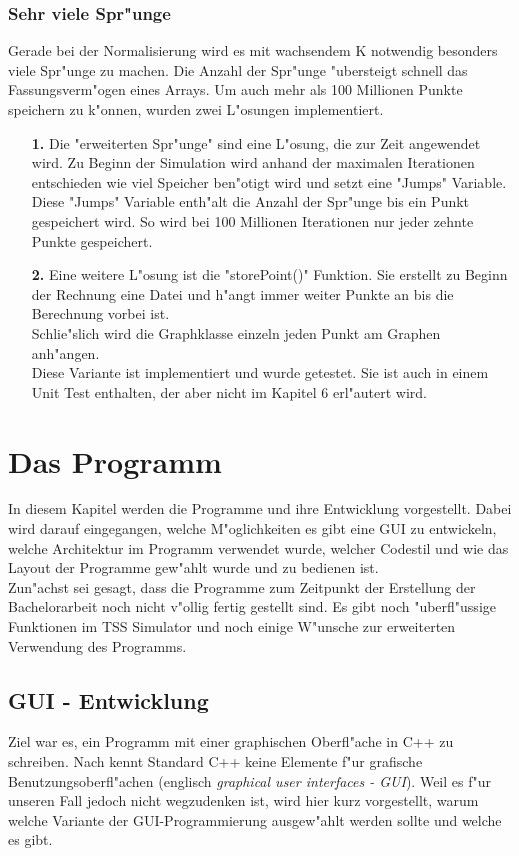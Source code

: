\documentclass[11pt, a4paper, german]{article}
\theoremstyle{plain}
\begin{document}
	\subsubsection{Sehr viele Spr"unge}
	Gerade bei der Normalisierung wird es mit wachsendem K notwendig besonders viele Spr"unge zu machen. Die Anzahl der Spr"unge "ubersteigt schnell das Fassungsverm"ogen eines Arrays.	Um auch mehr als 100 Millionen Punkte speichern zu k"onnen, wurden zwei L"osungen implementiert.\\
	\begin{itemize}
		\item[\textbf{1.}] Die "{}erweiterten Spr"unge"{} sind eine L"osung, die zur Zeit angewendet wird. Zu Beginn der Simulation wird anhand der maximalen Iterationen entschieden wie viel Speicher ben"otigt wird und setzt eine "{}Jumps"{} Variable. Diese "{}Jumps"{} Variable enth"alt die Anzahl der Spr"unge bis ein Punkt gespeichert wird. So wird bei 100 Millionen Iterationen nur jeder zehnte Punkte gespeichert. \\
		\item[\textbf{2.}] Eine weitere L"osung ist die "{}storePoint()"{} Funktion. Sie erstellt zu Beginn der Rechnung eine Datei und h"angt immer weiter Punkte an bis die Berechnung vorbei ist.\\
		Schlie"slich wird die Graphklasse einzeln jeden Punkt am Graphen anh"angen.\\ 
		Diese Variante ist implementiert und wurde getestet. Sie ist auch in einem Unit Test enthalten, der aber nicht im Kapitel 6 erl"autert wird.
	\end{itemize}

	
	
\clearpage	
\section{Das Programm}
In diesem Kapitel werden die Programme und ihre Entwicklung vorgestellt. Dabei wird darauf eingegangen, welche M"oglichkeiten es gibt eine GUI zu entwickeln, welche Architektur im Programm verwendet wurde, welcher Codestil und wie das Layout der Programme gew"ahlt wurde und zu bedienen ist.\\
Zun"achst sei gesagt, dass die Programme zum Zeitpunkt der Erstellung der Bachelorarbeit noch nicht v"ollig fertig gestellt sind. Es gibt noch "uberfl"ussige Funktionen im TSS Simulator und noch einige W"unsche zur erweiterten Verwendung des Programms. 

	\subsection{GUI - Entwicklung}
	Ziel war es, ein Programm mit einer graphischen Oberfl"ache in C++ zu schreiben. Nach \cite[14 - Grafische Benutzungsschnittstellen]{breymann2011c++} kennt Standard C++ keine Elemente f"ur grafische Benutzungsoberfl"achen (englisch \textit{graphical user interfaces - GUI}). Weil es f"ur unseren Fall jedoch nicht wegzudenken ist, wird hier kurz vorgestellt, warum welche Variante der GUI-Programmierung ausgew"ahlt werden sollte und welche es gibt.\\
	
\end{document}
